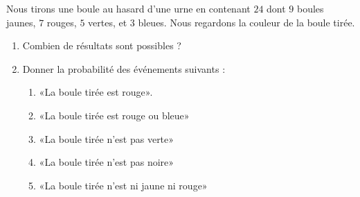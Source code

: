 
\begin{exercice}\label{exosmath-0189}

    Nous tirons une boule au hasard d'une urne en contenant \( 24\) dont \( 9\) boules jaunes, \( 7\) rouges, \( 5\) vertes, et \( 3\) bleues. Nous regardons la couleur de la boule tirée.
    \begin{enumerate}
        \item
            Combien de résultats sont possibles ?
        \item
            Donner la probabilité des événements suivants :
            \begin{enumerate}
                \item
                    «La boule tirée est rouge».
                \item
                    «La boule tirée est rouge ou bleue» 
                \item
                    «La boule tirée n'est pas verte» 
                \item
                    «La boule tirée n'est pas noire» 
                \item
                    «La boule tirée n'est ni jaune ni rouge»
            \end{enumerate}
    \end{enumerate}

\end{exercice}
